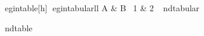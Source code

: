 egin{table}[h]
\centering
egin{tabular}{ll}
A & B \
1 & 2 \
nd{tabular}
\caption{simple latex table}
\label{tab-simple-latex}
nd{table}
